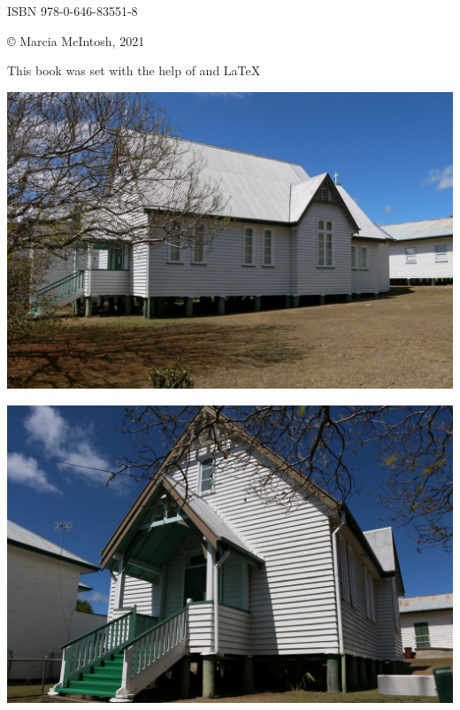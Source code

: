 \documentclass[a4paper,11pt,parskip=never,DIV=8,chapterprefix=true,titlepage=true,twoside,twocolumn,open=any]{scrbook}
\begin{document}
\begin{titlepage}
\begin{minipage}[b]{\textwidth}
\bigskip\noindent
ISBN 978-0-646-83551-8 	

\bigskip\noindent
\copyright{ }Marcia McIntosh, 2021

\bigskip\noindent
{\small This book was set with the help of {\KOMAScript} and {\LaTeX}}
\end{minipage}\par

\clearpage
\thispagestyle{empty}
\par\vspace*{.1\textheight}
\noindent\begin{minipage}[t]{\textwidth}
\begin{center}
\includegraphics[width=.85\linewidth,center]{../images/christChurchMurgon_2019_11_29.jpg}
\end{center}
\end{minipage}\par
\vspace{5mm}
\noindent\begin{minipage}[b]{\textwidth}
\begin{center}
\includegraphics[width=.85\linewidth,center]{../images/christChurchMurgon_front_1_2019_11_29.jpg}

\end{center}
\end{minipage}
\end{titlepage}
\end{document}
